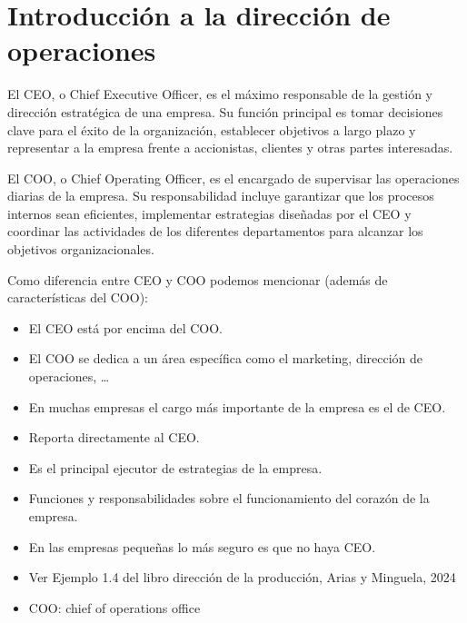 \documentclass[12pt]{report} %
\providecommand{\tightlist}{%
  \setlength{\itemsep}{0pt}\setlength{\parskip}{0pt}}
\begin{document}
\hypertarget{introducciuxf3n-a-la-direcciuxf3n-de-operaciones}{%
\chapter{Introducción a la dirección de
operaciones}\label{introducciuxf3n-a-la-direcciuxf3n-de-operaciones}}

\begin{definicion}
El CEO, o Chief Executive Officer, es el máximo responsable de la gestión y dirección estratégica de una empresa. Su función principal es tomar decisiones clave para el éxito de la organización, establecer objetivos a largo plazo y representar a la empresa frente a accionistas, clientes y otras partes interesadas.
\end{definicion}

\begin{definicion}
El COO, o Chief Operating Officer, es el encargado de supervisar las operaciones diarias de la empresa. Su responsabilidad incluye garantizar que los procesos internos sean eficientes, implementar estrategias diseñadas por el CEO y coordinar las actividades de los diferentes departamentos para alcanzar los objetivos organizacionales.
\end{definicion}

Como diferencia entre CEO y COO podemos mencionar (además de
características del COO):

\begin{itemize}
\tightlist
\item
  El CEO está por encima del COO.\\
\item
  El COO se dedica a un área específica como el marketing, dirección de
  operaciones, \ldots{}\\
\item
  En muchas empresas el cargo más importante de la empresa es el de
  CEO.\\
\item
  Reporta directamente al CEO.\\
\item
  Es el principal ejecutor de estrategias de la empresa.\\
\item
  Funciones y responsabilidades sobre el funcionamiento del corazón de
  la empresa.\\
\item
  En las empresas pequeñas lo más seguro es que no haya CEO.\\
\item
  Ver Ejemplo 1.4 del libro dirección de la producción, Arias y
  Minguela, 2024\\
\item
  COO: chief of operations office
\end{itemize}
\end{document}
